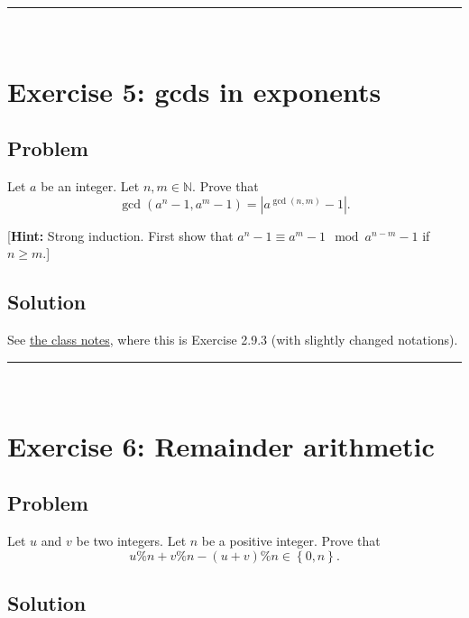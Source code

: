\documentclass[paper=a4, fontsize=12pt]{scrartcl} %
\newcommand{\NN}{\mathbb{N}} %
\newcommand{\set}[1]{\left\{ #1 \right\}}
\newcommand{\abs}[1]{\left| #1 \right|}
\newcommand{\tup}[1]{\left( #1 \right)}
\newcommand{\horrule}[1]{\rule{\linewidth}{#1}} %
\theoremstyle{plainsl}
\theoremstyle{definition}
\theoremstyle{remark}
\begin{document}
\horrule{0.3pt} \\[0.4cm]

\section{Exercise 5: gcds in exponents}

\subsection{Problem}

Let $a$ be an integer.
Let $n, m \in \NN$.
Prove that
\[
\gcd\tup{a^n - 1, a^m - 1}
= \abs{a^{\gcd\tup{n, m}} - 1}.
\]

[\textbf{Hint:} Strong induction. First show that
$a^n - 1 \equiv a^m - 1 \mod a^{n-m} - 1$ if $n \geq m$.]

\subsection{Solution}

See
\href{http://www-users.math.umn.edu/~dgrinber/19s/notes.pdf}{the class notes},
where this is Exercise 2.9.3 (with slightly changed notations).

\horrule{0.3pt} \\[0.4cm]

\section{Exercise 6: Remainder arithmetic}

\subsection{Problem}

Let $u$ and $v$ be two integers.
Let $n$ be a positive integer.
Prove that
\[
u \% n + v \% n - \tup{u+v} \% n \in \set{0, n} .
\]

\subsection{Solution}
\end{document}
